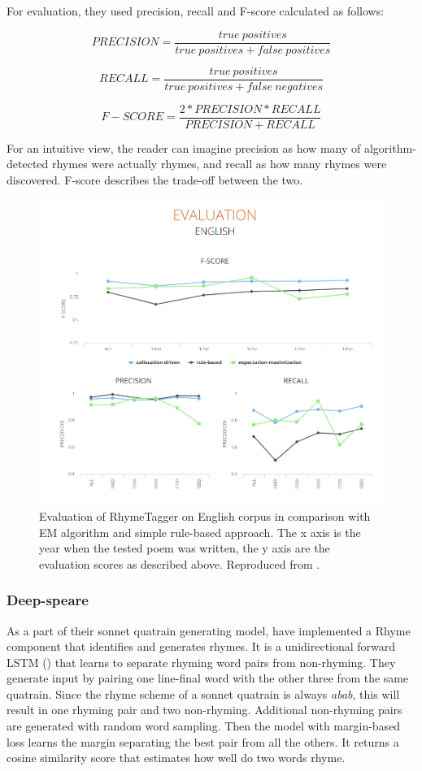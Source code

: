 For evaluation, they used precision, recall and F-score calculated as follows:

\[PRECISION=\frac{true\ positives}{true\ positives+false\ positives}\]

\[RECALL=\frac{true\ positives}{true\ positives+false\ negatives}\]

\[F-SCORE=\frac{2*PRECISION*RECALL}{PRECISION+RECALL}\]

For an intuitive view, the reader can imagine precision as how many of algorithm-detected rhymes were actually rhymes, and recall as how many rhymes were discovered. F-score describes the trade-off between the two.

\begin{figure}[h]\centering
	\includegraphics[scale=0.4]{../img/plechac_eval.png}
	\caption[RhymeTagger evaluation]{Evaluation of RhymeTagger on English corpus in comparison with EM algorithm and simple rule-based approach. The x axis is the year when the tested poem was written, the y axis are the evaluation scores as described above. Reproduced from \cite{plechac2017presentation}.}
	\label{screenshotRT}
\end{figure}


\subsubsection*{Deep-speare}
As a part of their \gls{sonnet} \gls{quatrain} generating model, \cite{lau2018deep} have implemented a Rhyme component that identifies and generates rhymes. It is a unidirectional forward \gls{LSTM} (\cite{hochreiter1997long}) that learns to separate rhyming word pairs from non-rhyming. They generate input by pairing one line-final word with the other three from the same quatrain. Since the rhyme scheme of a \gls{sonnet} \gls{quatrain} is always \textit{abab}, this will result in one rhyming pair and two non-rhyming. Additional non-rhyming pairs are generated with random word sampling. Then the model with margin-based loss learns the margin separating the best pair from all the others. It returns a cosine similarity score that estimates how well do two words rhyme.


